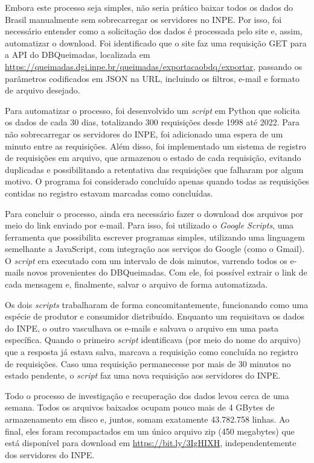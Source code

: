 \documentclass[cic,tc]{iiufrgs}
\begin{document}
Embora este processo seja simples, não seria prático baixar todos os dados do Brasil manualmente sem sobrecarregar os servidores no INPE. Por isso, foi necessário entender como a solicitação dos dados é processada pelo site e, assim, automatizar o download. Foi identificado que o site faz uma requisição GET para a API do DBQueimadas, localizada em \url{https://queimadas.dgi.inpe.br/queimadas/exportacaobdq/exportar}, passando os parâmetros codificados em JSON na URL, incluindo os filtros, e-mail e formato de arquivo desejado.

Para automatizar o processo, foi desenvolvido um \textit{script} em Python que solicita os dados de cada 30 dias, totalizando 300 requisições desde 1998 até 2022. Para não sobrecarregar os servidores do INPE, foi adicionado uma espera de um minuto entre as requisições. Além disso, foi implementado um sistema de registro de requisições em arquivo, que armazenou o estado de cada requisição, evitando duplicadas e possibilitando a retentativa das requisições que falharam por algum motivo. O programa foi considerado concluído apenas quando todas as requisições contidas no registro estavam marcadas como concluídas.

Para concluir o processo, ainda era necessário fazer o download dos arquivos por meio do link enviado por e-mail. Para isso, foi utilizado o \textit{Google Scripts}, uma ferramenta que possibilita escrever programas simples, utilizando uma linguagem semelhante a JavaScript, com integração aos serviços do Google (como o Gmail). O \textit{script} era executado com um intervalo de dois minutos, varrendo todos os e-mails novos provenientes do DBQueimadas. Com ele, foi possível extrair o link de cada mensagem e, finalmente, salvar o arquivo de forma automatizada. 

Os dois \textit{scripts} trabalharam de forma concomitantemente, funcionando como uma espécie de produtor e consumidor distribuído. Enquanto um requisitava os dados do INPE, o outro vasculhava os e-mails e salvava o arquivo em uma pasta específica. Quando o primeiro \textit{script} identificava (por meio do nome do arquivo) que a resposta já estava salva, marcava a requisição como concluída no registro de requisições. Caso uma requisição permanecesse por mais de 30 minutos no estado pendente, o \textit{script} faz uma nova requisição aos servidores do INPE.

Todo o processo de investigação e recuperação dos dados levou cerca de uma semana. Todos os arquivos baixados ocupam pouco mais de 4 GBytes de armazenamento em disco e, juntos, somam exatamente 43.782.758 linhas. Ao final, eles foram recompactados em um único arquivo zip (450 megabytes) que está disponível para download em \url{https://bit.ly/3IgHIXH}, independentemente dos servidores do INPE.
\end{document}

